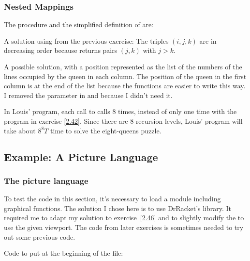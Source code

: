 \subsubsection{Nested Mappings}

\begin{exe}[2.40]
    The procedure  and the simplified definition of 
     are:
\end{exe}

\begin{exe}[2.41]
    A solution using  from the previous exercise:
    The triples $(i, j, k)$ are in decreasing order because  
    returns pairs $(j, k)$ with $j > k$.
\end{exe}

\begin{exe}[2.42]
    \label{2.42}
    A possible solution, with a position represented as the list of the numbers 
    of the lines occupied by the queen in each column. The position of the queen 
    in the first column is at the end of the list because the functions are 
    easier to write this way. I removed the  parameter in  
    and  because I didn’t need it.
\end{exe}

\begin{exe}[2.43]
    In Louis’ program, each call to  calls 
     8 times, instead of only one time with the 
    program in exercise \ref{2.42}. Since there are 8 recursion levels, Louis’ 
    program will take about $8^8T$ time to solve the eight-queens puzzle.
\end{exe}

\subsection{Example: A Picture Language}
\label{2.2.4}

\subsubsection{The picture language}

\begin{comp}
    To test the code in this section, it’s necessary to load a module including 
    graphical functions. The solution I chose here is to use DrRacket’s 
     library. It required me to adapt my solution to 
    exercise~\ref{2.46} and to slightly modify the  to 
    use the given viewport. The code from later exercises is sometimes needed to 
    try out some previous code.

    Code to put at the beginning of the file:
\end{comp}

